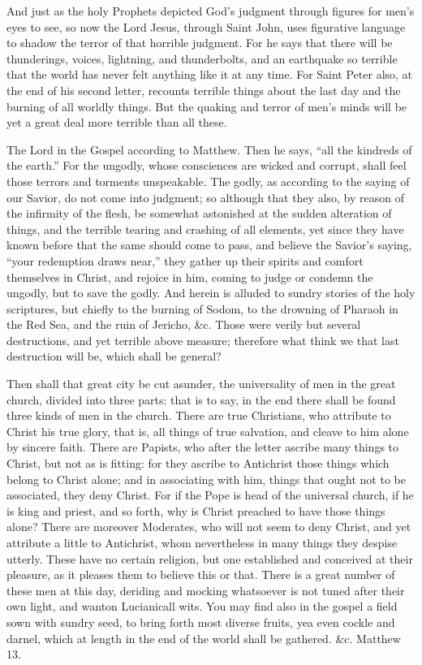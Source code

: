 And just as the holy Prophets depicted God’s judgment through figures for men’s eyes to see, so now the Lord Jesus, through Saint John, uses figurative language to shadow the terror of that horrible judgment. For he says that there will be thunderings, voices, lightning, and thunderbolts, and an earthquake so terrible that the world has never felt anything like it at any time. For Saint Peter also, at the end of his second letter, recounts terrible things about the last day and the burning of all worldly things. But the quaking and terror of men’s minds will be yet a great deal more terrible than all these.

The Lord in the Gospel according to Matthew. Then he says, “all the kindreds of the earth.” For the ungodly, whose consciences are wicked and corrupt, shall feel those terrors and torments unspeakable. The godly, as according to the saying of our Savior, do not come into judgment; so although that they also, by reason of the infirmity of the flesh, be somewhat astonished at the sudden alteration of things, and the terrible tearing and crashing of all elements, yet since they have known before that the same should come to pass, and believe the Savior’s saying, “your redemption draws near,” they gather up their spirits and comfort themselves in Christ, and rejoice in him, coming to judge or condemn the ungodly, but to save the godly. And herein is alluded to sundry stories of the holy scriptures, but chiefly to the burning of Sodom, to the drowning of Pharaoh in the Red Sea, and the ruin of Jericho, \&c. Those were verily but several destructions, and yet terrible above measure; therefore what think we that last destruction will be, which shall be general?

Then shall that great city be cut asunder, the universality of men in the great church, divided into three parts: that is to say, in the end there shall be found three kinds of men in the church. There are true Christians, who attribute to Christ his true glory, that is, all things of true salvation, and cleave to him alone by sincere faith. There are Papists, who after the letter ascribe many things to Christ, but not as is fitting: for they ascribe to Antichrist those things which belong to Christ alone; and in associating with him, things that ought not to be associated, they deny Christ. For if the Pope is head of the universal church, if he is king and priest, and so forth, why is Christ preached to have those things alone? There are moreover Moderates, who will not seem to deny Christ, and yet attribute a little to Antichrist, whom nevertheless in many things they despise utterly. These have no certain religion, but one established and conceived at their pleasure, as it pleases them to believe this or that. There is a great number of these men at this day, deriding and mocking whatsoever is not tuned after their own light, and wanton Lucianicall wits. You may find also in the gospel a field sown with sundry seed, to bring forth most diverse fruits, yea even cockle and darnel, which at length in the end of the world shall be gathered. \&c. Matthew 13.

